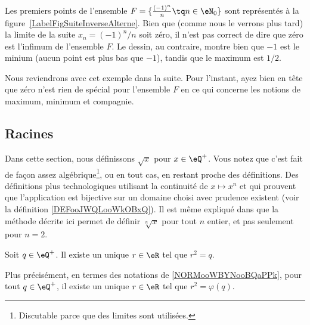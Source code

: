 \begin{example}
	Les premiers points de l'ensemble $F=\{ \frac{ (-1)^n }{ n }\tq n\in\eN_0 \}$ sont représentés à la figure~\ref{LabelFigSuiteInverseAlterne}. Bien que (comme nous le verrons plus tard) la limite de la suite $x_n=(-1)^n/n$ soit zéro, il n'est pas correct de dire que zéro est l'infimum de l'ensemble $F$. Le dessin, au contraire, montre bien que $-1$ est le minium (aucun point est plus bas que $-1$), tandis que le maximum est $1/2$.

	Nous reviendrons avec cet exemple dans la suite. Pour l'instant, ayez bien en tête que zéro n'est rien de spécial pour l'ensemble $F$ en ce qui concerne les notions de maximum, minimum et compagnie.
\end{example}
\newcommand{\CaptionFigSuiteInverseAlterne}{Les quelques premiers points du type $(-1)^n/n$.}


\subsection{Racines}
\label{SUBSECooMBCNooEqjjTY}

Dans cette section, nous définissons \( \sqrt{ x }\) pour \( x\in\eQ^+\). Vous notez que c'est fait de façon assez algébrique\footnote{Discutable parce que des limites sont utilisées.}, ou en tout cas, en restant proche des définitions. Des définitions plus technologiques utilisant la continuité de \( x\mapsto x^n\) et qui prouvent que l'application est bijective sur un domaine choisi avec prudence existent (voir la définition \ref{DEFooJWQLooWkOBxQ}). Il est même expliqué dans \cite{BIBooMPXEooQLKhku} que la méthode décrite ici permet de définir \( \sqrt[n]{ x }\) pour tout \( n\) entier, et pas seulement pour \( n=2\).

\begin{proposition}     \label{PROPooUHKFooVKmpte}
	Soit \( q\in \eQ^+\). Il existe un unique \( r\in \eR\) tel que \( r^2=q\).

	Plus précisément, en termes des notations de \ref{NORMooWBYNooBQaPPk}, pour tout \( q\in \eQ^+\), il existe un unique \( r\in \eR\) tel que \( r^2=\varphi(q)\).
\end{proposition}

